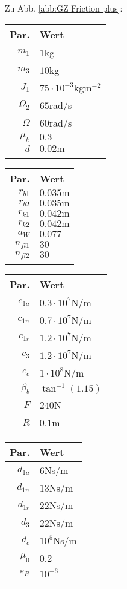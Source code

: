 Zu Abb. \ref{abb:GZ Friction plus}:
\begin{center}
\begin{tabular}{r|l}
Par.&Wert\\\hline
$m_1$&$1$kg\\
$m_3$&$10$kg\\
$J_1$&$75\cdot10^{-3}$kgm$^{-2}$\\
$\Omega_2$&$65$rad/s\\
$\Omega$& $60$rad/s\\
$\mu_k$& $0.3$\\
$d $&$ 0.02\textrm{m}$ \\
&
\end{tabular}\hfill
\begin{tabular}{r|l}
Par.&Wert\\\hline
$r_{b1}$&$0.035\textrm{m}$\\
$r_{b2}$&$0.035\textrm{m}$\\
$r_{k1}$&$0.042\textrm{m}$\\
$r_{k2}$&$0.042\textrm{m}$\\
$a_W $&$ 0.077$\\
$n_{fl1}$&$30$\\
$n_{fl2}$&$30$\\
&
\end{tabular}\hfill
\begin{tabular}{r|l}
Par.&Wert\\\hline
$c_{1a}$&$0.3\cdot10^{7}$N/m\\
$c_{1n}$&$0.7\cdot10^{7}$N/m\\
$c_{1r}$&$1.2\cdot10^{7}$N/m\\
$c_{3}$&$1.2\cdot10^{7}$N/m\\
$c_{c}$&$1\cdot10^{8}$N/m\\
$\beta_b$ & $\tan^{-1}(1.15)$\\
$F$&$240$N\\
$R$&$0.1$m\\
\end{tabular}\hfill
\begin{tabular}{r|l}
Par.&Wert\\\hline
$d_{1a}$&$6$Ns/m\\
$d_{1n}$&$13$Ns/m\\
$d_{1r}$&$22$Ns/m\\
$d_{3}$&$22$Ns/m\\
$d_{c}$&$10^{5}$Ns/m\\
$\mu_0$&0.2\\
$\varepsilon_R $&$ 10^{-6}$\\
&
\end{tabular}
\end{center}

